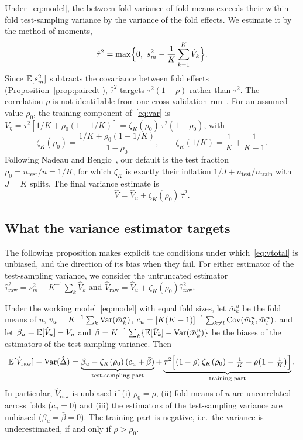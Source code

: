 Under~\eqref{eq:model}, the between-fold variance of fold means exceeds their within-fold test-sampling variance by the variance of the fold effects. We estimate it by the method of moments,
\begin{equation}\label{eq:tau}
\hat\tau^2=\max\Bigl\{0,\ s_m^2-\frac1K\sum_{k=1}^K\hat V_k\Bigr\}.
\end{equation}
Since $\mathbb{E}[s_m^2]$ subtracts the covariance between fold effects (Proposition~\ref{prop:pairedt}), $\hat\tau^2$ targets $\tau^2(1-\rho)$ rather than $\tau^2$. The correlation $\rho$ is not identifiable from one cross-validation run~\cite{bengio2004}. For an assumed value $\rho_0$, the training component of~\eqref{eq:var} is $V_\eta=\tau^2[1/K+\rho_0(1-1/K)]=\zeta_K(\rho_0)\,\tau^2(1-\rho_0)$, with
\begin{equation}\label{eq:zeta}
\zeta_K(\rho_0)=\frac{1/K+\rho_0(1-1/K)}{1-\rho_0},\qquad \zeta_K(1/K)=\frac1K+\frac1{K-1}.
\end{equation}
Following Nadeau and Bengio~\cite{nadeau2003}, our default is the test fraction $\rho_0=n_{\text{test}}/n=1/K$, for which $\zeta_K$ is exactly their inflation $1/J+n_{\text{test}}/n_{\text{train}}$ with $J=K$ splits. The final variance estimate is
\begin{equation}\label{eq:vtotal}
\hat V=\hat V_u+\zeta_K(\rho_0)\,\hat\tau^2 .
\end{equation}

\subsection{What the variance estimator targets}

The following proposition makes explicit the conditions under which~\eqref{eq:vtotal} is unbiased, and the direction of its bias when they fail. For either estimator of the test-sampling variance, we consider the untruncated estimator $\hat\tau^2_{\mathrm{raw}}=s_m^2-K^{-1}\sum_k\hat V_k$ and $\hat V_{\mathrm{raw}}=\hat V_u+\zeta_K(\rho_0)\hat\tau^2_{\mathrm{raw}}$.

\begin{proposition}\label{prop:bias}
Under the working model~\eqref{eq:model} with equal fold sizes, let $\bar m^u_k$ be the fold means of $u$, $v_u=K^{-1}\sum_k\operatorname{Var}(\bar m^u_k)$, $c_u=[K(K-1)]^{-1}\sum_{k\neq l}\operatorname{Cov}(\bar m^u_k,\bar m^u_l)$, and let $\beta_u=\mathbb{E}[\hat V_u]-V_u$ and $\bar\beta=K^{-1}\sum_k\{\mathbb{E}[\hat V_k]-\operatorname{Var}(\bar m^u_k)\}$ be the biases of the estimators of the test-sampling variance. Then
\begin{equation}\label{eq:bias}
\mathbb{E}[\hat V_{\mathrm{raw}}]-\operatorname{Var}(\hat\Delta)
=\underbrace{\beta_u-\zeta_K(\rho_0)\,(c_u+\bar\beta)}_{\text{test-sampling part}}
+\underbrace{\tau^2\Bigl[(1-\rho)\,\zeta_K(\rho_0)-\tfrac1K-\rho\bigl(1-\tfrac1K\bigr)\Bigr]}_{\text{training part}} .
\end{equation}
In particular, $\hat V_{\mathrm{raw}}$ is unbiased if (i) $\rho_0=\rho$, (ii) fold means of $u$ are uncorrelated across folds ($c_u=0$) and (iii) the estimators of the test-sampling variance are unbiased ($\beta_u=\bar\beta=0$). The training part is negative, i.e.\ the variance is underestimated, if and only if $\rho>\rho_0$.
\end{proposition}


